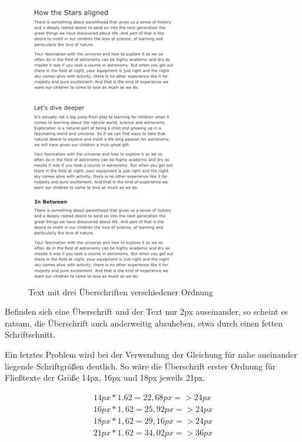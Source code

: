 \begin{figure}[h]
    \centering
    \includegraphics[width=0.6\textwidth]{images/three-headlines.png}
    \caption{Text mit drei Überschriften verschiedener Ordnung}
    \label{fig:threeHeadlines}
\end{figure}

Befinden sich eine Überschrift und der Text nur 2px auseinander, so scheint es ratsam, die Überschrift auch anderweitig abzuheben, etwa durch einen fetten Schriftschnitt.

Ein letztes Problem wird bei der Verwendung der Gleichung für nahe aneinander liegende Schriftgrößen deutlich. So wäre die Überschrift erster Ordnung für Fließtexte der Größe 14px, 16px und 18px jeweils 21px.


\begin{equation}
\begin{split}
14px * 1.62 = 22,68px => 24px \\
16px * 1,62 = 25,92px => 24px \\
18px * 1,62 = 29,16px => 24px \\
21px * 1,62 = 34,02px => 36px \\	
\end{split}
\end{equation}


